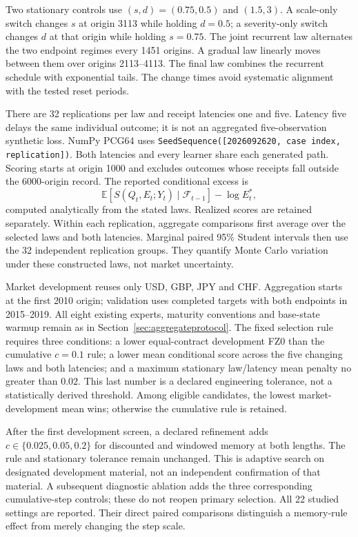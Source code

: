 \documentclass[11pt,a4paper]{article}
\theoremstyle{definition}\newtheorem{definition}[theorem]{Definition}
\begin{document}
Two stationary controls use $(s,d)=(0.75,0.5)$ and $(1.5,3)$. A scale-only switch changes $s$ at origin 3113 while holding $d=0.5$; a severity-only switch changes $d$ at that origin while holding $s=0.75$. The joint recurrent law alternates the two endpoint regimes every 1451 origins. A gradual law linearly moves between them over origins 2113--4113. The final law combines the recurrent schedule with exponential tails. The change times avoid systematic alignment with the tested reset periods.

There are 32 replications per law and receipt latencies one and five. Latency five delays the same individual outcome; it is not an aggregated five-observation synthetic loss. NumPy PCG64 uses \texttt{SeedSequence([2026092620, case index, replication])}. Both latencies and every learner share each generated path. Scoring starts at origin 1000 and excludes outcomes whose receipts fall outside the 6000-origin record. The reported conditional excess is
\[
 \mathbb E[S(Q_t,E_t;Y_t)\mid\mathcal F_{t-1}]-\log E_t^*,
\]
computed analytically from the stated laws. Realized scores are retained separately. Within each replication, aggregate comparisons first average over the selected laws and both latencies. Marginal paired 95\% Student intervals then use the 32 independent replication groups. They quantify Monte Carlo variation under these constructed laws, not market uncertainty.

Market development reuses only USD, GBP, JPY and CHF. Aggregation starts at the first 2010 origin; validation uses completed targets with both endpoints in 2015--2019. All eight existing experts, maturity conventions and base-state warmup remain as in Section~\ref{sec:aggregateprotocol}. The fixed selection rule requires three conditions: a lower equal-contract development FZ0 than the cumulative $c=0.1$ rule; a lower mean conditional score across the five changing laws and both latencies; and a maximum stationary law/latency mean penalty no greater than $0.02$. This last number is a declared engineering tolerance, not a statistically derived threshold. Among eligible candidates, the lowest market-development mean wins; otherwise the cumulative rule is retained.

After the first development screen, a declared refinement adds $c\in\{0.025,0.05,0.2\}$ for discounted and windowed memory at both lengths. The rule and stationary tolerance remain unchanged. This is adaptive search on designated development material, not an independent confirmation of that material. A subsequent diagnostic ablation adds the three corresponding cumulative-step controls; these do not reopen primary selection. All 22 studied settings are reported. Their direct paired comparisons distinguish a memory-rule effect from merely changing the step scale.
\end{document}
